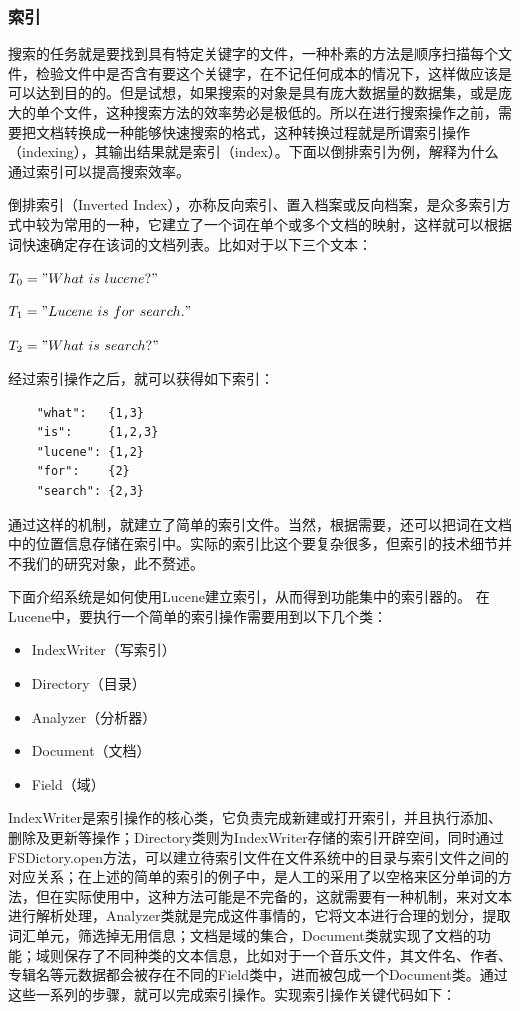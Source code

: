 \documentclass[12pt,a4paper]{article}
\begin{document}
		\subsubsection{索引}
	搜索的任务就是要找到具有特定关键字的文件，一种朴素的方法是顺序扫描每个文件，检验文件中是否含有要这个关键字，在不记任何成本的情况下，这样做应该是可以达到目的的。但是试想，如果搜索的对象是具有庞大数据量的数据集，或是庞大的单个文件，这种搜索方法的效率势必是极低的。所以在进行搜索操作之前，需要把文档转换成一种能够快速搜索的格式，这种转换过程就是所谓索引操作（indexing），其输出结果就是索引（index）。下面以倒排索引为例，解释为什么通过索引可以提高搜索效率。
	
	倒排索引（Inverted Index），亦称反向索引、置入档案或反向档案，是众多索引方式中较为常用的一种，它建立了一个词在单个或多个文档的映射，这样就可以根据词快速确定存在该词的文档列表。比如对于以下三个文本：
	
	$T_0 = "What\ is\ lucene?"$
	
	$T_1 = "Lucene\ is\ for\ search."$
	
	$T_2 = "What\ is\ search?"$
	
	经过索引操作之后，就可以获得如下索引：
	\begin{lstlisting}
	"what":   {1,3}
	"is":     {1,2,3}
	"lucene": {1,2}
	"for":    {2}
	"search": {2,3}
	\end{lstlisting}
	
	通过这样的机制，就建立了简单的索引文件。当然，根据需要，还可以把词在文档中的位置信息存储在索引中。实际的索引比这个要复杂很多，但索引的技术细节并不我们的研究对象，此不赘述。
	
	下面介绍系统是如何使用Lucene建立索引，从而得到功能集中的索引器的。
	在Lucene中，要执行一个简单的索引操作需要用到以下几个类：
	
	\begin{itemize}
		\item IndexWriter（写索引）
		\item Directory（目录）
		\item Analyzer（分析器）
		\item Document（文档）
		\item Field（域）
	\end{itemize}
	
	IndexWriter是索引操作的核心类，它负责完成新建或打开索引，并且执行添加、删除及更新等操作；Directory类则为IndexWriter存储的索引开辟空间，同时通过FSDictory.open方法，可以建立待索引文件在文件系统中的目录与索引文件之间的对应关系；在上述的简单的索引的例子中，是人工的采用了以空格来区分单词的方法，但在实际使用中，这种方法可能是不完备的，这就需要有一种机制，来对文本进行解析处理，Analyzer类就是完成这件事情的，它将文本进行合理的划分，提取词汇单元，筛选掉无用信息；文档是域的集合，Document类就实现了文档的功能；域则保存了不同种类的文本信息，比如对于一个音乐文件，其文件名、作者、专辑名等元数据都会被存在不同的Field类中，进而被包成一个Document类。通过这些一系列的步骤，就可以完成索引操作。实现索引操作关键代码如下：
	
\end{document}
